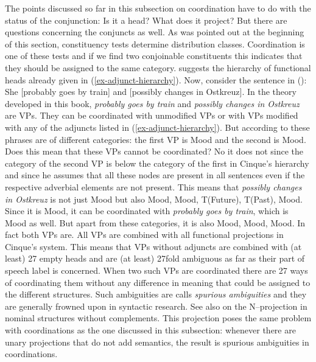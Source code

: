 The points discussed so far in this subsection on coordination have to do with the status of the
conjunction: Is it a head? What does it project? But there are questions concerning the conjuncts as
well. As was pointed out at the beginning of this section, constituency tests determine distribution
classes. Coordination is one of these tests and if we find two conjoinable constituents this
indicates that they should be assigned to the same category.
\citet[]{Cinque99a-u} suggests the hierarchy of functional heads already given in (\ref{ex-adjunct-hierarchy}).
Now, consider the sentence in ():
\ea
She [probably goes by train] and [possibly changes in Ostkreuz].
\z
In the theory developed in this book, \emph{probably goes by train} and \emph{possibly changes in
  Ostkreuz} are VPs. They can be coordinated with unmodified VPs or with VPs modified with any of
the adjuncts listed in (\ref{ex-adjunct-hierarchy}). But according to \citeauthor{Cinque99a-u} these phrases
are of different categories: the first VP is Mood and the second is
Mood. Does this mean that these VPs cannot be coordinated? No it does not since the
category of the second VP is below the category of the first in Cinque's hierarchy and since he
assumes that all these nodes are present in all sentences even if the respective adverbial elements
are not present. This means that \emph{possibly changes in Ostkreuz} is not just
Mood but also Mood, Mood, T(Future), T(Past),
Mood. Since it is Mood, it can be coordinated with \emph{probably goes
  by train}, which is Mood as well. But apart from these categories, it is also
Mood, Mood, Mood. In fact both VPs are. All VPs are
combined with all functional projections in Cinque's system. This means that VPs without adjuncts
are combined with (at least) 27 empty heads and are (at least) 27fold ambiguous as far as their part
of speech label is concerned. When two such VPs are
coordinated there are 27 ways of coordinating them without any difference in meaning that could be
assigned to the different structures. Such ambiguities are calls \emph{spurious ambiguities} and
they are generally frowned upon in syntactic research. See also  on the
N–\nbar projection in nominal structures without complements. This projection poses the same problem
with coordinations as the one discussed in this subsection: whenever there are unary projections
that do not add semantics, the result is spurious ambiguities in coordinations.

